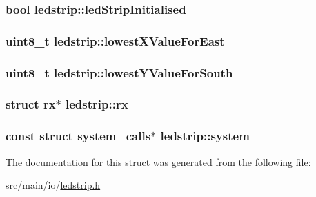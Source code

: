 \hypertarget{structledstrip_af273bcb2aec363d4ab0fc7cdb9cb5087}{
\subsubsection[{led\+Strip\+Initialised}]{\setlength{\rightskip}{0pt plus 5cm}bool ledstrip\+::led\+Strip\+Initialised}}\label{structledstrip_af273bcb2aec363d4ab0fc7cdb9cb5087}
\hypertarget{structledstrip_a3d17dd05feb7c4617e23899cfb92f356}{
\subsubsection[{lowest\+X\+Value\+For\+East}]{\setlength{\rightskip}{0pt plus 5cm}uint8\+\_\+t ledstrip\+::lowest\+X\+Value\+For\+East}}\label{structledstrip_a3d17dd05feb7c4617e23899cfb92f356}
\hypertarget{structledstrip_a3bd6da4dddc63ceec2ae5679ca9f8a52}{
\subsubsection[{lowest\+Y\+Value\+For\+South}]{\setlength{\rightskip}{0pt plus 5cm}uint8\+\_\+t ledstrip\+::lowest\+Y\+Value\+For\+South}}\label{structledstrip_a3bd6da4dddc63ceec2ae5679ca9f8a52}
\hypertarget{structledstrip_a7d7585060085e213f829865ee0a6c3b5}{
\subsubsection[{rx}]{\setlength{\rightskip}{0pt plus 5cm}struct {\bf rx}$\ast$ ledstrip\+::rx}}\label{structledstrip_a7d7585060085e213f829865ee0a6c3b5}
\hypertarget{structledstrip_a6f53375ca6f69251c47dd0e987267757}{
\subsubsection[{system}]{\setlength{\rightskip}{0pt plus 5cm}const struct {\bf system\+\_\+calls}$\ast$ ledstrip\+::system}}\label{structledstrip_a6f53375ca6f69251c47dd0e987267757}


The documentation for this struct was generated from the following file\+:\begin{DoxyCompactItemize}
\item 
src/main/io/\hyperlink{io_2ledstrip_8h}{ledstrip.\+h}\end{DoxyCompactItemize}
